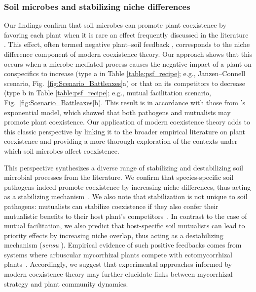 \subsubsection*{Soil microbes and stabilizing niche differences}
Our findings confirm that soil microbes can promote plant coexistence by favoring each plant when it is rare an effect frequently discussed in the literature \citep{Bever1997, Hart2003, Bever2003, KeMiki2015}.
This effect, often termed negative plant--soil feedback \citep{Bever1997}, corresponds to the niche difference component of modern coexistence theory.
Our approach shows that this occurs when a microbe-mediated process causes the negative impact of a plant on conspecifics to increase (type a in Table \ref{table:psf_recipe}; e.g., Janzen--Connell scenario, Fig.~\ref{fig:Scenario_Battleaxes}a) or that on its competitors to decrease (type b in Table \ref{table:psf_recipe}; e.g., mutual facilitation scenario, Fig.~\ref{fig:Scenario_Battleaxes}b).
This result is in accordance with those from \citeauthor{Bever1997}'s \citeyearpar{Bever1997} exponential model, which showed that both pathogens and mutualists may promote plant coexistence.
Our application of modern coexistence theory adds to this classic perspective by linking it to the broader empirical literature on plant coexistence and providing a more thorough exploration of the contexts under which soil microbes affect coexistence.
\par


This perspective synthesizes a diverse range of stabilizing and destabilizing soil microbial processes from the literature.
We confirm that species-specific soil pathogens indeed promote coexistence by increasing niche differences, thus acting as a stabilizing mechanism~\citep{Petermann2008}. We also note that stabilization is not unique to soil pathogens: mutualists can stabilize coexistence if they also confer their mutualistic benefits to their host plant's competitors~\citep{Bever1999, Bever2002}.
In contrast to the case of mutual facilitation, we also predict that host-specific soil mutualists can lead to priority effects by increasing niche overlap, thus acting as a destabilizing mechanism (\textit{sensu} \citealt{Fukami2016}). Empirical evidence of such positive feedbacks comes from systems where arbuscular mycorrhizal plants compete with ectomycorrhizal plants~\citep{McGuire2007, Bennett2017, Kadowaki2017}.
Accordingly, we suggest that experimental approaches informed by modern coexistence theory \citep{Hart2018} may further elucidate links between mycorrhizal strategy and plant community dynamics.
\par



